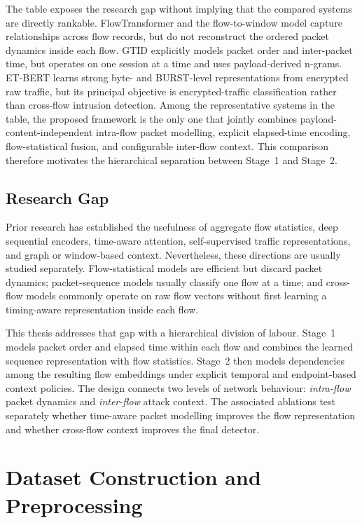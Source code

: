 \documentclass[11pt,fleqn]{report}
\begin{document}
The table exposes the research gap without implying that the compared systems are directly rankable. FlowTransformer and the flow-to-window model capture relationships across flow records, but do not reconstruct the ordered packet dynamics inside each flow. GTID explicitly models packet order and inter-packet time, but operates on one session at a time and uses payload-derived n-grams. ET-BERT learns strong byte- and BURST-level representations from encrypted raw traffic, but its principal objective is encrypted-traffic classification rather than cross-flow intrusion detection. Among the representative systems in the table, the proposed framework is the only one that jointly combines payload-content-independent intra-flow packet modelling, explicit elapsed-time encoding, flow-statistical fusion, and configurable inter-flow context. This comparison therefore motivates the hierarchical separation between Stage~1 and Stage~2.
\section{Research Gap}
\label{subsec:rw_gap}

Prior research has established the usefulness of aggregate flow statistics, deep sequential encoders, time-aware attention, self-supervised traffic representations, and graph or window-based context. Nevertheless, these directions are usually studied separately. Flow-statistical models are efficient but discard packet dynamics; packet-sequence models usually classify one flow at a time; and cross-flow models commonly operate on raw flow vectors without first learning a timing-aware representation inside each flow.

This thesis addresses that gap with a hierarchical division of labour. Stage~1 models packet order and elapsed time within each flow and combines the learned sequence representation with flow statistics. Stage~2 then models dependencies among the resulting flow embeddings under explicit temporal and endpoint-based context policies. The design connects two levels of network behaviour: \emph{intra-flow} packet dynamics and \emph{inter-flow} attack context. The associated ablations test separately whether time-aware packet modelling improves the flow representation and whether cross-flow context improves the final detector.

\providecommand{\datasetfield}[1]{\texttt{\detokenize{#1}}}


\chapter{Dataset Construction and Preprocessing}
\label{sec:dataset_preprocessing}
\end{document}
